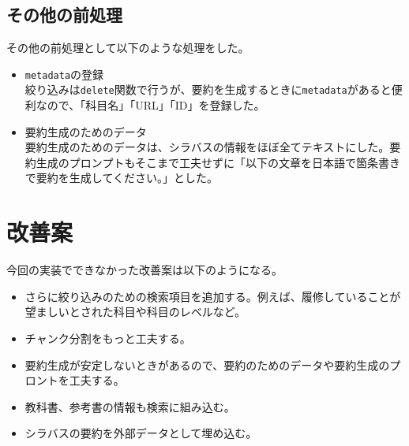 \subsection{その他の前処理}
その他の前処理として以下のような処理をした。

\begin{itemize}
  \item \texttt{metadata}の登録\\
  絞り込みは\texttt{delete}関数で行うが、要約を生成するときに\texttt{metadata}があると便利なので、「科目名」「URL」「ID」を登録した。

  \item 要約生成のためのデータ\\
  要約生成のためのデータは、シラバスの情報をほぼ全てテキストにした。要約生成のプロンプトもそこまで工夫せずに「以下の文章を日本語で箇条書きで要約を生成してください。」とした。
\end{itemize}

\section{改善案}
今回の実装でできなかった改善案は以下のようになる。

\begin{itemize}
  \item さらに絞り込みのための検索項目を追加する。例えば、履修していることが望ましいとされた科目や科目のレベルなど。
  \item チャンク分割をもっと工夫する。
  \item 要約生成が安定しないときがあるので、要約のためのデータや要約生成のプロントを工夫する。
  \item 教科書、参考書の情報も検索に組み込む。
  \item シラバスの要約を外部データとして埋め込む。
\end{itemize}
